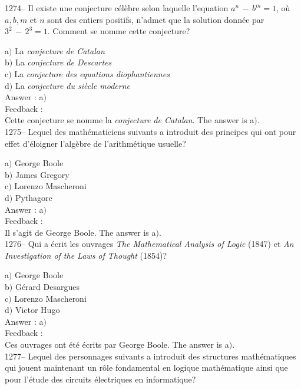 ﻿\documentclass[letterpaper, 12pt]{article}
\begin{document}
1274-- Il existe une conjecture c\'el\`ebre selon laquelle
l'equation $a^n\,-\,b^m=1$, o\`u $a,b,m$ et $n$ sont des entiers
positifs, n'admet que la solution donn\'ee par $3^2\,-\,2^3=1$.
Comment se nomme cette conjecture?

a$)$ La {\sl conjecture de Catalan} \\
b$)$ La {\sl conjecture de Descartes} \\
c$)$ La {\sl conjecture des equations diophantiennes} \\
d$)$ La {\sl conjecture du si\`ecle moderne}\\

Answer : a$)$\\

Feedback : \\
Cette conjecture se nomme la {\sl conjecture de Catalan}.
The answer is a$)$.\\

1275-- Lequel des math\'ematiciens suivants a introduit des
principes qui ont pour effet d'\'eloigner l'alg\`ebre de
l'arithm\'etique usuelle?

a$)$ George Boole \\
b$)$ James Gregory \\
c$)$ Lorenzo Mascheroni \\
d$)$ Pythagore\\

Answer : a$)$\\

Feedback : \\
Il s'agit de George Boole.
The answer is a$)$.\\

1276-- Qui a \'ecrit les ouvrages {\sl The Mathematical Analysis of
Logic} (1847) et {\sl An Investigation of the Laws of Thought}
(1854)?

a$)$ George Boole \\
b$)$ G\'erard Desargues \\
c$)$ Lorenzo Mascheroni \\
d$)$ Victor Hugo\\

Answer : a$)$\\

Feedback : \\
Ces ouvrages ont \'et\'e \'ecrits par George Boole.
The answer is a$)$.\\

1277-- Lequel des personnages suivants a introduit des structures
math\'ematiques qui jouent maintenant un r\^ole fondamental en
logique math\'ematique ainsi que pour l'\'etude des circuits
\'electriques en informatique?
\end{document}
